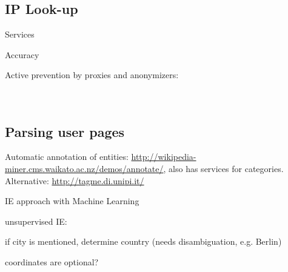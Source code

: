 

\subsection{IP Look-up}\label{sub:iplookup}

\begin{todos}
    \item Services
    \item Accuracy
    \item Active prevention by proxies and anonymizers: 
    \\  
    \\ 
    \\ 
\end{todos}

%
%


\subsection{Parsing user pages}

\begin{todos}
\item Automatic annotation of entities: \url{http://wikipedia-miner.cms.waikato.ac.nz/demos/annotate/}, also has services for categories. Alternative: \url{http://tagme.di.unipi.it/}
    \item IE approach with Machine Learning 
    \item unsupervised IE: 
    \item if city is mentioned, determine country (needs disambiguation, e.g. Berlin)
    \item coordinates are optional?
\end{todos}

